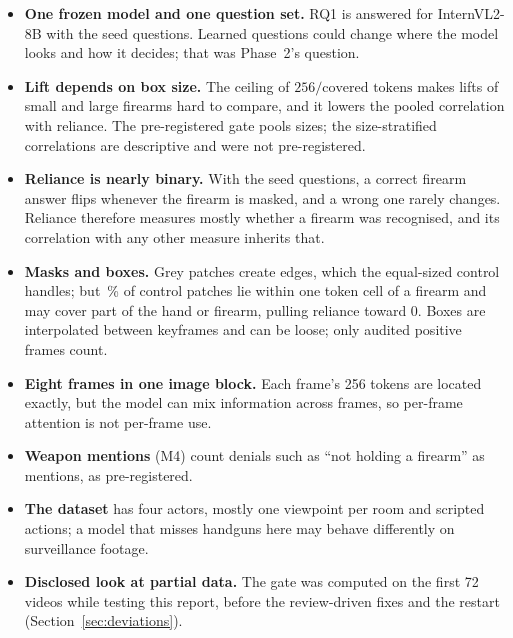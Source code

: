 \begin{itemize}
\item \textbf{One frozen model and one question set.} RQ1 is answered for InternVL2-8B with the seed questions. Learned questions could change where the model looks and how it decides; that was Phase~2's question.
\item \textbf{Lift depends on box size.} The ceiling of $256/\text{covered tokens}$ makes lifts of small and large firearms hard to compare, and it lowers the pooled correlation with reliance. The pre-registered gate pools sizes; the size-stratified correlations are descriptive and were not pre-registered.
\item \textbf{Reliance is nearly binary.} With the seed questions, a correct firearm answer flips whenever the firearm is masked, and a wrong one rarely changes. Reliance therefore measures mostly whether a firearm was recognised, and its correlation with any other measure inherits that.
\item \textbf{Masks and boxes.} Grey patches create edges, which the equal-sized control handles; but \,\% of control patches lie within one token cell of a firearm and may cover part of the hand or firearm, pulling reliance toward 0. Boxes are interpolated between keyframes and can be loose; only audited positive frames count.
\item \textbf{Eight frames in one image block.} Each frame's 256 tokens are located exactly, but the model can mix information across frames, so per-frame attention is not per-frame use.
\item \textbf{Weapon mentions} (M4) count denials such as ``not holding a firearm'' as mentions, as pre-registered.
\item \textbf{The dataset} has four actors, mostly one viewpoint per room and scripted actions; a model that misses handguns here may behave differently on surveillance footage.
\item \textbf{Disclosed look at partial data.} The gate was computed on the first 72 videos while testing this report, before the review-driven fixes and the restart (Section~\ref{sec:deviations}).
\end{itemize}

